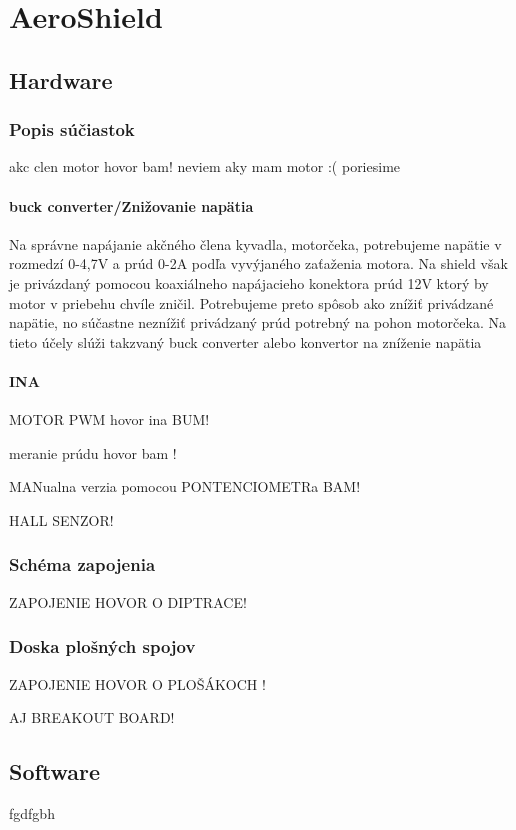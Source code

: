 \chapter{AeroShield}

\section{Hardware}
\subsection{Popis súčiastok}

akc clen motor hovor bam!
neviem aky mam motor :( 
poriesime

\subsubsection{buck converter/Znižovanie napätia}

Na správne napájanie akčného člena kyvadla, motorčeka, potrebujeme napätie v rozmedzí 0-4,7V a prúd 0-2A podľa vyvýjaného zaťaženia motora. Na shield však je privázdaný pomocou koaxiálneho napájacieho konektora prúd 12V ktorý by motor v priebehu chvíle zničil. Potrebujeme preto spôsob ako znížiť privádzané napätie, no súčastne neznížiť privádzaný prúd potrebný na pohon motorčeka. Na tieto účely slúži takzvaný buck converter alebo konvertor na zníženie napätia

\subsubsection{INA}
MOTOR PWM hovor ina BUM!

meranie prúdu hovor bam !

MANualna verzia pomocou PONTENCIOMETRa BAM!

HALL SENZOR!

\subsection{Schéma zapojenia}

ZAPOJENIE HOVOR O DIPTRACE!

\subsection{Doska plošných spojov}

ZAPOJENIE HOVOR O PLOŠÁKOCH !

AJ BREAKOUT BOARD!

\section{Software}
fgdfgbh 
